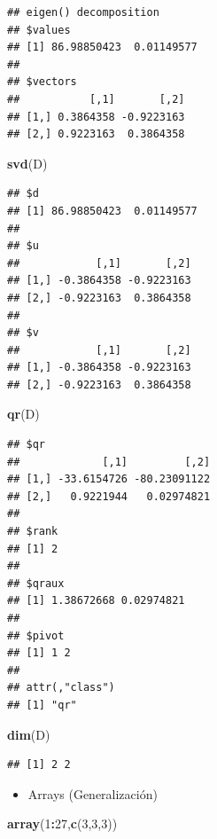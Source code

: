 \documentclass[
]{book}
\newenvironment{Shaded}{\begin{snugshade}}{\end{snugshade}}
\newcommand{\DecValTok}[1]{\textcolor[rgb]{0.00,0.00,0.81}{#1}}
\newcommand{\KeywordTok}[1]{\textcolor[rgb]{0.13,0.29,0.53}{\textbf{#1}}}
\newcommand{\NormalTok}[1]{#1}
\newcommand{\OperatorTok}[1]{\textcolor[rgb]{0.81,0.36,0.00}{\textbf{#1}}}
\providecommand{\tightlist}{%
  \setlength{\itemsep}{0pt}\setlength{\parskip}{0pt}}
\begin{document}
\begin{verbatim}
## eigen() decomposition
## $values
## [1] 86.98850423  0.01149577
## 
## $vectors
##           [,1]       [,2]
## [1,] 0.3864358 -0.9223163
## [2,] 0.9223163  0.3864358
\end{verbatim}

\begin{Shaded}
\begin{Highlighting}[]
\KeywordTok{svd}\NormalTok{(D)}
\end{Highlighting}
\end{Shaded}

\begin{verbatim}
## $d
## [1] 86.98850423  0.01149577
## 
## $u
##            [,1]       [,2]
## [1,] -0.3864358 -0.9223163
## [2,] -0.9223163  0.3864358
## 
## $v
##            [,1]       [,2]
## [1,] -0.3864358 -0.9223163
## [2,] -0.9223163  0.3864358
\end{verbatim}

\begin{Shaded}
\begin{Highlighting}[]
\KeywordTok{qr}\NormalTok{(D)}
\end{Highlighting}
\end{Shaded}

\begin{verbatim}
## $qr
##             [,1]         [,2]
## [1,] -33.6154726 -80.23091122
## [2,]   0.9221944   0.02974821
## 
## $rank
## [1] 2
## 
## $qraux
## [1] 1.38672668 0.02974821
## 
## $pivot
## [1] 1 2
## 
## attr(,"class")
## [1] "qr"
\end{verbatim}

\begin{Shaded}
\begin{Highlighting}[]
\KeywordTok{dim}\NormalTok{(D)}
\end{Highlighting}
\end{Shaded}

\begin{verbatim}
## [1] 2 2
\end{verbatim}

\begin{itemize}
\tightlist
\item
  Arrays (Generalización)
\end{itemize}

\begin{Shaded}
\begin{Highlighting}[]
\KeywordTok{array}\NormalTok{(}\DecValTok{1}\OperatorTok{:}\DecValTok{27}\NormalTok{,}\KeywordTok{c}\NormalTok{(}\DecValTok{3}\NormalTok{,}\DecValTok{3}\NormalTok{,}\DecValTok{3}\NormalTok{))}
\end{Highlighting}
\end{Shaded}
\end{document}
